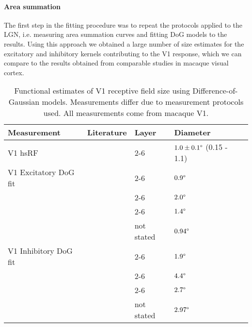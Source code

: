 \paragraph{Area summation}

The first step in the fitting procedure was to repeat the protocols
applied to the LGN, i.e. measuring area summation curves and fitting
DoG models to the results. Using this approach we obtained a large
number of size estimates for the excitatory and inhibitory kernels
contributing to the V1 response, which we can compare to the results
obtained from comparable studies in macaque visual cortex.

\begin{table}
  \centering
  \begin{adjustbox}{width=1\textwidth}
  \begin{tabular}{l | l l l l}
    Measurement              & Literature            & Layer & Diameter \\
    \hline
    V1 hsRF                  & \cite{Levitt2002}     & 2-6 & $1.0 \pm 0.1\degree$ (0.15 - 1.1) \\
    \hline
    V1 Excitatory DoG fit    & \cite{Levitt2002}     & 2-6 & $0.9\degree$ \\
                             & \cite{Sceniak2001}    & 2-6 & $2.0\degree$ \\
                             & \cite{Cavanaugh2002}  & 2-6 & $1.4\degree$ \\
                             & \cite{Solomon2002}    & not stated & $0.94\degree$ \\
    \hline
    V1 Inhibitory DoG fit    & \cite{Levitt2002}     & 2-6 & $1.9\degree$ \\
                             & \cite{Sceniak2001}    & 2-6 & $4.4\degree$ \\
                             & \cite{Cavanaugh2002}  & 2-6 & $2.7\degree$ \\
                             & \cite{Solomon2002}    & not stated & $2.97\degree$ \\
    \hline
  \end{tabular}
  \end{adjustbox}
  \caption[Functional estimates of V1 receptive field size using
    Difference-of-Gaussian models.]{Functional estimates of V1
    receptive field size using Difference-of-Gaussian
    models. Measurements differ due to measurement protocols used. All
    measurements come from macaque V1.}
  \label{electrophystable}
\end{table}


